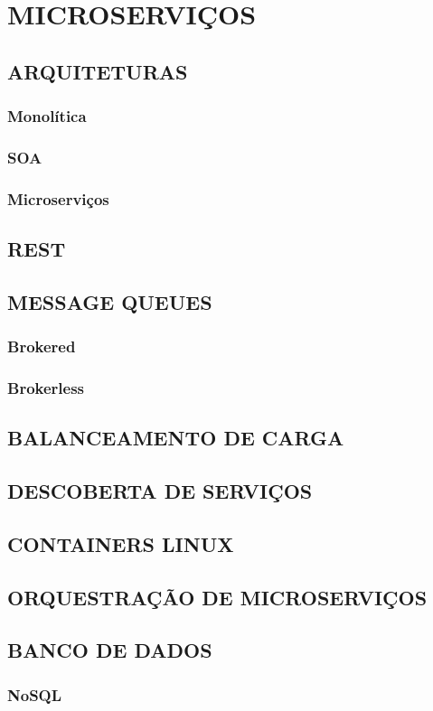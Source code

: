 \chapter{MICROSERVIÇOS}

\section{ARQUITETURAS}

\subsection{Monolítica}

\subsection{SOA}

\subsection{Microserviços}

\section{REST}

\section{MESSAGE QUEUES}

\subsection{Brokered}

\subsection{Brokerless}

\section{BALANCEAMENTO DE CARGA}

\section{DESCOBERTA DE SERVIÇOS}

\section{CONTAINERS LINUX}

\section{ORQUESTRAÇÃO DE MICROSERVIÇOS}

\section{BANCO DE DADOS}

\subsection{NoSQL}
